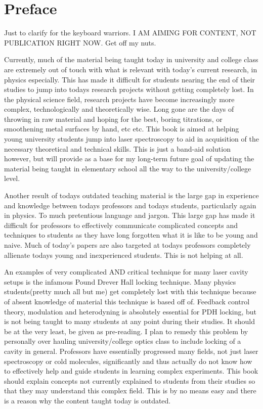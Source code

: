 \documentclass[a4paper]{book}
\begin{document}
\frontmatter
	
\chapter{Preface}
	\label{chp:preface}
	Just to clarify for the keyboard warriors. I AM AIMING FOR CONTENT, NOT PUBLICATION RIGHT NOW. Get off my nuts.
	
	Currently, much of the material being taught today in university and college class are extremely out of touch with what is relevant with today's current research, in physics especially. This has made it difficult for students nearing the end of their studies to jump into todays research projects without getting completely lost. In the physical science field, research projects have become increasingly more complex, technologically and theoretically wise. Long gone are the days of throwing in raw material and hoping for the best, boring titrations, or smoothening metal surfaces by hand, etc etc. This book is aimed at helping young university students jump into laser spectroscopy to aid in acquisition of the necessary theoretical and technical skills. This is just a band-aid solution however, but will provide as a base for my long-term future goal of updating the material being taught in elementary school all the way to the university/college level. 
	
	Another result of todays outdated teaching material is the large gap in experience and knowledge between todays professors and todays students, particularly again in physics. To much pretentious language and jargon. This large gap has made it difficult for professors to effectively communicate complicated concepts and techniques to students as they have long forgotten what it is like to be young and naive. Much of today's papers are also targeted at todays professors completely allienate todays young and inexperienced students. This is not helping at all.
	
	An examples of very complicated AND critical technique for many laser cavity setups is the infamous Pound Drever Hall locking technique. Many physics students(pretty much all but me) get completely lost with this technique because of absent knowledge of material this technique is based off of. Feedback control theory, modulation and heterodyning is absolutely essential for PDH locking, but is not being taught to many students at any point during their studies. It should be at the very least, be given as pre-reading. I plan to remedy this problem by personally over hauling university/college optics class to include locking of a cavity in general. Professors have essentially progressed many fields, not just laser spectroscopy or cold molecules, significantly and thus actually do not know how to effectively help and guide students in learning complex experiments. This book should explain concepts not currently explained to students from their studies so that they may understand this complex field. This is by no means easy and there is a reason why the content taught today is outdated.
	
\end{document}

